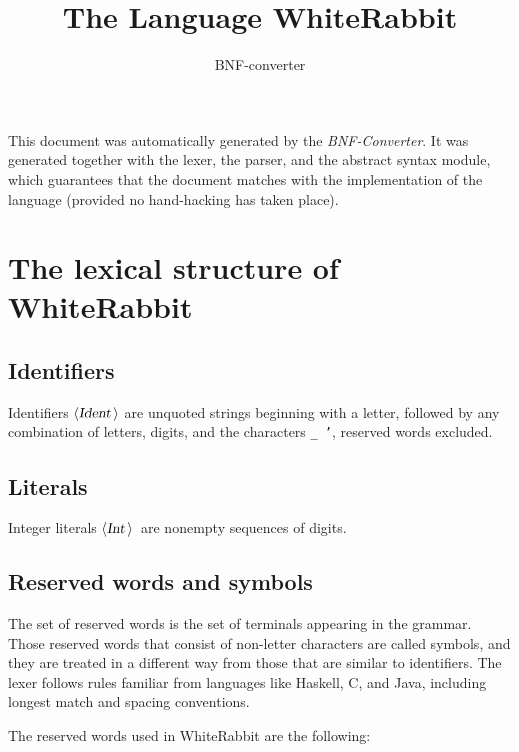 \documentclass[a4paper,11pt]{article}
\author{BNF-converter}
\title{The Language WhiteRabbit}
\begin{document}
\maketitle

\newcommand{\emptyP}{\mbox{$\epsilon$}}
\newcommand{\terminal}[1]{\mbox{{\texttt {#1}}}}
\newcommand{\nonterminal}[1]{\mbox{$\langle \mbox{{\sl #1 }} \! \rangle$}}
\newcommand{\arrow}{\mbox{::=}}
\newcommand{\delimit}{\mbox{$|$}}
\newcommand{\reserved}[1]{\mbox{{\texttt {#1}}}}
\newcommand{\literal}[1]{\mbox{{\texttt {#1}}}}
\newcommand{\symb}[1]{\mbox{{\texttt {#1}}}}

This document was automatically generated by the {\em BNF-Converter}. It was generated together with the lexer, the parser, and the abstract syntax module, which guarantees that the document matches with the implementation of the language (provided no hand-hacking has taken place).

\section*{The lexical structure of WhiteRabbit}
\subsection*{Identifiers}
Identifiers \nonterminal{Ident} are unquoted strings beginning with a letter,
followed by any combination of letters, digits, and the characters {\tt \_ '},
reserved words excluded.


\subsection*{Literals}
Integer literals \nonterminal{Int}\ are nonempty sequences of digits.




\subsection*{Reserved words and symbols}
The set of reserved words is the set of terminals appearing in the grammar. Those reserved words that consist of non-letter characters are called symbols, and they are treated in a different way from those that are similar to identifiers. The lexer follows rules familiar from languages like Haskell, C, and Java, including longest match and spacing conventions.

The reserved words used in WhiteRabbit are the following: \\
\end{document}
